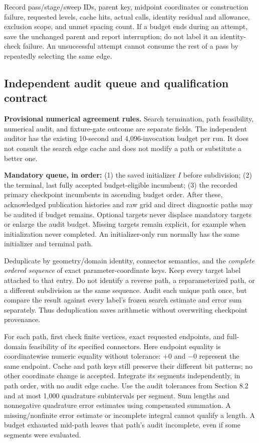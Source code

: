 \documentclass[11pt,letterpaper]{article}
\begin{document}
Record pass/stage/sweep IDs, parent key, midpoint coordinates or construction failure, requested levels, cache hits, actual calls, identity residual and allowance, exclusion scope, and unmet spacing count. If a budget ends during an attempt, save the unchanged parent and report interruption; do not label it an identity-check failure. An unsuccessful attempt cannot consume the rest of a pass by repeatedly selecting the same edge.

\subsection{Independent audit queue and qualification contract}\label{sec:audit-contract}
\textbf{Provisional numerical agreement rules.} Search termination, path feasibility, numerical audit, and fixture-gate outcome are separate fields. The independent auditor has the existing 10-second and 4,096-invocation budget per run. It does not consult the search edge cache and does not modify a path or substitute a better one.

\textbf{Mandatory queue, in order:} (1) the saved initializer $I$ before subdivision; (2) the terminal, last fully accepted budget-eligible incumbent; (3) the recorded primary checkpoint incumbents in ascending budget order. After these, acknowledged publication histories and raw grid and direct diagnostic paths may be audited if budget remains. Optional targets never displace mandatory targets or enlarge the audit budget. Missing targets remain explicit, for example when initialization never completed. An initializer-only run normally has the same initializer and terminal path.

Deduplicate by geometry/domain identity, connector semantics, and the \emph{complete ordered sequence} of exact parameter-coordinate keys. Keep every target label attached to that entry. Do not identify a reverse path, a reparameterized path, or a different subdivision as the same sequence. Audit each unique path once, but compare the result against every label's frozen search estimate and error sum separately. Thus deduplication saves arithmetic without overwriting checkpoint provenance.

For each path, first check finite vertices, exact requested endpoints, and full-domain feasibility of its specified connectors. Here endpoint equality is coordinatewise numeric equality without tolerance: $+0$ and $-0$ represent the same endpoint. Cache and path keys still preserve their different bit patterns; no other coordinate change is accepted. Integrate its segments independently, in path order, with no audit edge cache. Use the audit tolerances from Section 8.2 and at most 1,000 quadrature subintervals per segment. Sum lengths and nonnegative quadrature error estimates using compensated summation. A missing/nonfinite error estimate or incomplete integral cannot qualify a length. A budget exhausted mid-path leaves that path's audit incomplete, even if some segments were evaluated.
\end{document}

